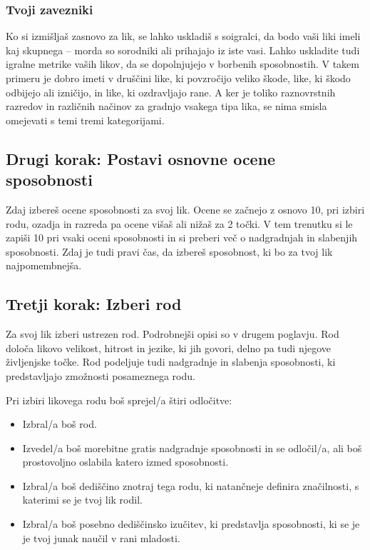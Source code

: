 \subsubsection{Tvoji zavezniki}
Ko si izmišljaš zasnovo za lik, se lahko uskladiš s soigralci, da bodo vaši liki imeli kaj skupnega -- morda so sorodniki ali prihajajo iz iste vasi. Lahko uskladite tudi igralne metrike vaših likov, da se dopolnjujejo v borbenih sposobnostih. V takem primeru je dobro imeti v druščini like, ki povzročijo veliko škode, like, ki škodo odbijejo ali izničijo, in like, ki ozdravljajo rane. A ker je toliko raznovrstnih razredov in različnih načinov za gradnjo vsakega tipa lika, se nima smisla omejevati s temi tremi kategorijami.

\subsection{Drugi korak: Postavi osnovne ocene sposobnosti}
Zdaj izbereš ocene sposobnosti za svoj lik. Ocene se začnejo z osnovo 10, pri izbiri rodu, ozadja in razreda pa ocene višaš ali nižaš za 2 točki. V tem trenutku si le zapiši 10 pri vsaki oceni sposobnosti in si preberi več o nadgradnjah in slabenjih sposobnosti. Zdaj je tudi pravi čas, da izbereš sposobnost, ki bo za tvoj lik najpomembnejša.

\subsection{Tretji korak: Izberi rod}
Za svoj lik izberi ustrezen rod. Podrobnejši opisi so v drugem poglavju. Rod določa likovo velikost, hitrost in jezike, ki jih govori, delno pa tudi njegove življenjske točke. Rod podeljuje tudi nadgradnje in slabenja sposobnosti, ki predstavljajo zmožnosti posameznega rodu.

Pri izbiri likovega rodu boš sprejel/a štiri odločitve:

\begin{itemize}
    \item Izbral/a boš rod.
    \item Izvedel/a boš morebitne gratis nadgradnje sposobnosti in se odločil/a, ali boš prostovoljno oslabila katero izmed sposobnosti.
    \item Izbral/a boš dediščino znotraj tega rodu, ki natančneje definira značilnosti, s katerimi se je tvoj lik rodil.
    \item Izbral/a boš posebno dediščinsko izučitev, ki predstavlja sposobnosti, ki se je je tvoj junak naučil v rani mladosti.
\end{itemize}

